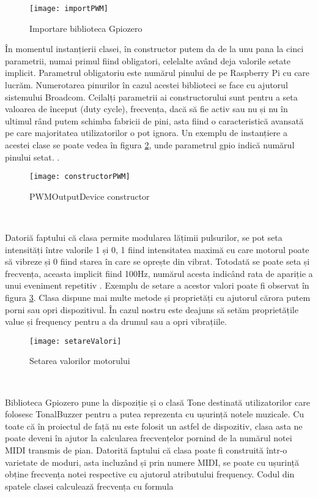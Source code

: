 \documentclass[../IoMusT.tex]{subfiles}
\begin{document}
\begin{figure}[h]
\centering
\texttt{[image: importPWM]}
\caption{Importare biblioteca Gpiozero}
\label{fig:import}
\end{figure}
În momentul instanțierii clasei, în constructor putem da de la unu pana la cinci parametrii, numai primul fiind obligatori, celelalte având deja valorile setate implicit. Parametrul obligatoriu este numărul pinului de pe Raspberry Pi cu care lucrăm. Numerotarea pinurilor în cazul acestei biblioteci se face cu ajutorul sistemului Broadcom. Ceilalți parametrii ai constructorului sunt pentru a seta valoarea de început (duty cycle), frecvența, dacă să fie activ sau nu și nu în ultimul rând putem schimba fabricii de pini, asta fiind o caracteristică avansată pe care majoritatea utilizatorilor o pot ignora. Un exemplu de instanțiere a acestei clase se poate vedea în figura \ref{fig:constructor}, unde parametrul gpio indică numărul pinului setat. .
\begin{figure}[h]
\centering
\texttt{[image: constructorPWM]}
\caption{PWMOutputDevice constructor}
\label{fig:constructor}
\end{figure}
\\
\par Datoriă faptului că clasa permite modularea lățimii pulsurilor, se pot seta intensități între valorile 1 și 0, 1 fiind intensitatea maximă cu care motorul poate să vibreze și 0 fiind starea în care se oprește din vibrat. Totodată se poate seta și frecvența, aceasta implicit fiind 100Hz, numărul acesta indicând rata de apariție a unui eveniment repetitiv \cite{Freq}. Exemplu de setare a acestor valori poate fi observat în figura \ref{fig:val}. Clasa dispune mai multe metode și proprietăți cu ajutorul cărora putem porni sau opri dispozitivul. În cazul nostru este deajuns să setăm proprietățile value și frequency pentru a da drumul sau a opri vibrațiile. 
\begin{figure}[h]
\centering
\texttt{[image: setareValori]}
\caption{Setarea valorilor motorului}
\label{fig:val}
\end{figure}
\\
\par Biblioteca Gpiozero pune la dispoziție și o clasă Tone destinată utilizatorilor care folosesc TonalBuzzer pentru a putea reprezenta cu ușurință notele muzicale. Cu toate că în proiectul de față nu este folosit un astfel de dispozitiv, clasa asta ne poate deveni în ajutor la calcularea frecvențelor pornind de la numărul notei MIDI transmis de pian. Datorită faptului că clasa poate fi construită într-o varietate de moduri, asta incluzând și prin numere MIDI, se poate cu ușurință obține frecvența notei respective cu ajutorul atributului frequency. Codul din spatele clasei calculează frecvența cu formula
\end{document}
